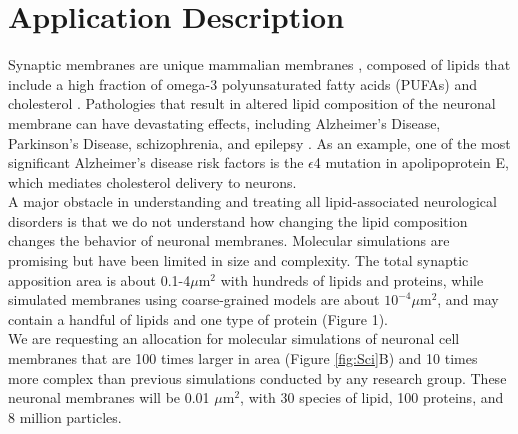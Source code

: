 \documentclass[oneside]{report}
\begin{document}
\section*{Application Description}

Synaptic membranes are unique mammalian membranes \cite{Bozek2015}, composed of lipids that include a high fraction of omega-3 polyunsaturated fatty acids (PUFAs) and cholesterol \cite{Isolated1969,Breckenridge1973,Ingolfsson2017a}.  Pathologies that result in altered lipid composition of the neuronal membrane can have devastating effects, including Alzheimer's Disease, Parkinson's Disease, schizophrenia, and epilepsy \cite{MuralikrishnaAdibhatla}. As an example,  %
one of the most significant Alzheimer's disease risk factors is the $\epsilon$4 mutation in apolipoprotein E, which mediates cholesterol delivery to neurons.\cite{liu2013}\\

A major obstacle in understanding and treating all lipid-associated neurological disorders is that we do not understand how changing the lipid composition changes the behavior of neuronal membranes.  Molecular simulations are promising but have been limited in size and complexity.  The total synaptic apposition area is about 0.1-4$\mu$m$^{2}$\cite{yeow1991} with hundreds of lipids and proteins, while simulated membranes using coarse-grained models are about $10^{-4}\mu$m$^{2}$, and may contain a handful of lipids and one type of protein (Figure 1). \\

We are requesting an allocation for molecular simulations of neuronal cell membranes that are 100 times larger in area (Figure \ref{fig:Sci}B) and 10 times more complex than previous simulations conducted by any research group. These neuronal membranes will be 0.01 $\mu$m$^{2}$, with 30 species of lipid, 100 proteins, and 8 million particles. \\
\end{document}
